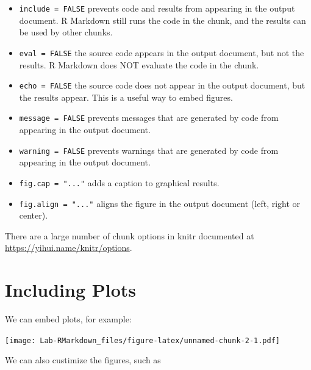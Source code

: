 \documentclass[]{article}
\newenvironment{Shaded}{\begin{snugshade}}{\end{snugshade}}
\newcommand{\DataTypeTok}[1]{\textcolor[rgb]{0.13,0.29,0.53}{#1}}
\newcommand{\DecValTok}[1]{\textcolor[rgb]{0.00,0.00,0.81}{#1}}
\newcommand{\KeywordTok}[1]{\textcolor[rgb]{0.13,0.29,0.53}{\textbf{#1}}}
\newcommand{\NormalTok}[1]{#1}
\newcommand{\OperatorTok}[1]{\textcolor[rgb]{0.81,0.36,0.00}{\textbf{#1}}}
\newcommand{\StringTok}[1]{\textcolor[rgb]{0.31,0.60,0.02}{#1}}
\providecommand{\tightlist}{%
  \setlength{\itemsep}{0pt}\setlength{\parskip}{0pt}}
\begin{document}
\begin{itemize}
\tightlist
\item
  \texttt{include\ =\ FALSE} prevents code and results from appearing in
  the output document. R Markdown still runs the code in the chunk, and
  the results can be used by other chunks.
\item
  \texttt{eval\ =\ FALSE} the source code appears in the output
  document, but not the results. R Markdown does NOT evaluate the code
  in the chunk.
\item
  \texttt{echo\ =\ FALSE} the source code does not appear in the output
  document, but the results appear. This is a useful way to embed
  figures.
\item
  \texttt{message\ =\ FALSE} prevents messages that are generated by
  code from appearing in the output document.
\item
  \texttt{warning\ =\ FALSE} prevents warnings that are generated by
  code from appearing in the output document.
\item
  \texttt{fig.cap\ =\ "..."} adds a caption to graphical results.
\item
  \texttt{fig.align\ =\ "..."} aligns the figure in the output document
  (left, right or center).
\end{itemize}

There are a large number of chunk options in knitr documented at
\url{https://yihui.name/knitr/options}.

\hypertarget{including-plots}{%
\section{Including Plots}\label{including-plots}}

We can embed plots, for example:

\begin{Shaded}
\end{Shaded}

\texttt{[image: Lab-RMarkdown\_files/figure-latex/unnamed-chunk-2-1.pdf]}

We can also custimize the figures, such as
\end{document}
